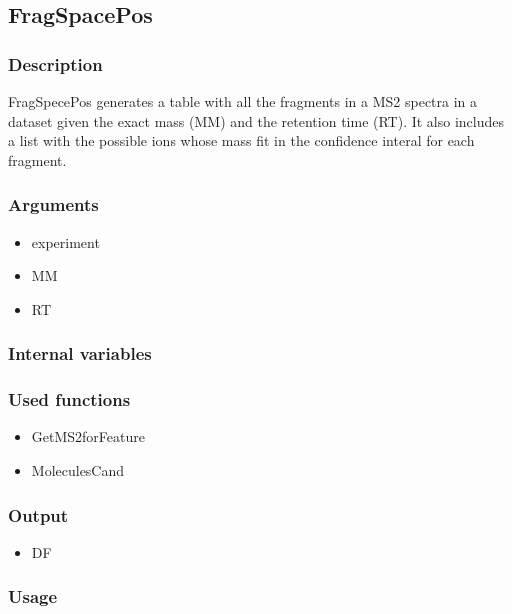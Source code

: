 \subsection{FragSpacePos}
\subsubsection{Description}
FragSpecePos generates a table with all the fragments in a MS2 spectra in a dataset given the exact mass (MM) and the retention time (RT). It also includes a list with the possible ions whose mass fit in the confidence interal for each fragment.
\subsubsection{Arguments}
\begin{itemize}
\item experiment
\item MM
\item RT
\end{itemize}
\subsubsection{Internal variables}
\subsubsection{Used functions}
\begin{itemize}
\item GetMS2forFeature
\item MoleculesCand
\end{itemize}
\subsubsection{Output}
\begin{itemize}
\item DF
\end{itemize}
\subsubsection{Usage}
